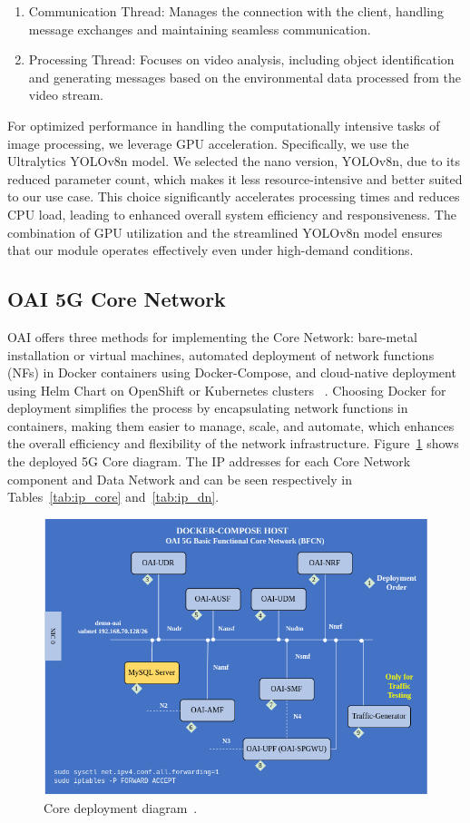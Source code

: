 \begin{enumerate}
\item Communication Thread: Manages the connection with the client, handling message exchanges and maintaining seamless communication.
\item Processing Thread: Focuses on video analysis, including object identification and generating messages based on the environmental data processed from the video stream.
\end{enumerate}

For optimized performance in handling the computationally intensive tasks of image processing, we leverage GPU acceleration.
Specifically, we use the Ultralytics YOLOv8n model.
We selected the nano version, YOLOv8n, due to its reduced parameter count, which makes it less resource-intensive and better suited to our use case.
This choice significantly accelerates processing times and reduces CPU load, leading to enhanced overall system efficiency and responsiveness.
The combination of GPU utilization and the streamlined YOLOv8n model ensures that our module operates effectively even under high-demand conditions.



\subsection{OAI 5G Core Network}\label{subsec:oai-5g-core-network}
OAI offers three methods for implementing the Core Network: bare-metal installation or virtual machines, automated deployment of network functions (NFs) in Docker containers using Docker-Compose, and cloud-native deployment using Helm Chart on OpenShift or Kubernetes clusters ~\cite{oai5gcore}.
Choosing Docker for deployment simplifies the process by encapsulating network functions in containers, making them easier to manage, scale, and automate, which enhances the overall efficiency and flexibility of the network infrastructure.
Figure~\ref{fig:core_depl} shows the deployed 5G Core diagram.
The IP addresses for each Core Network component and Data Network and can be seen respectively in Tables~\ref{tab:ip_core} and~\ref{tab:ip_dn}.


\begin{figure}[H]
    \centering
    \includegraphics[width=0.7\linewidth]{figures/core_deply}
    \caption{Core deployment diagram~\cite{oai_cn5g_fed_deploy}.}
    \label{fig:core_depl}
\end{figure}


